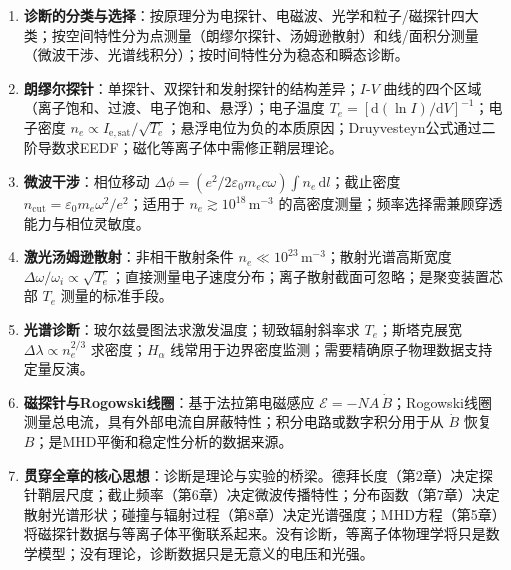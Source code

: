 \documentclass[12pt,a4paper,openany,oneside]{book}
\newcommand{\diff}{\mathrm{d}}
\newcommand{\eps}{\varepsilon}
\begin{document}
\begin{chapterreview}[title={第12章要点回顾：诊断——理论落地的桥梁}]
\begin{enumerate}
    \item \textbf{诊断的分类与选择}：按原理分为电探针、电磁波、光学和粒子/磁探针四大类；按空间特性分为点测量（朗缪尔探针、汤姆逊散射）和线/面积分测量（微波干涉、光谱线积分）；按时间特性分为稳态和瞬态诊断。
    
    \item \textbf{朗缪尔探针}：单探针、双探针和发射探针的结构差异；$I$-$V$ 曲线的四个区域（离子饱和、过渡、电子饱和、悬浮）；电子温度 $T_e = [\diff(\ln I)/\diff V]^{-1}$；电子密度 $n_e \propto I_{\mathrm{e,sat}}/\sqrt{T_e}$；悬浮电位为负的本质原因；Druyvesteyn公式通过二阶导数求EEDF；磁化等离子体中需修正鞘层理论。
    
    \item \textbf{微波干涉}：相位移动 $\Delta\phi = (e^2/2\eps_0 m_e c\omega) \int n_e\,\diff l$；截止密度 $n_{\mathrm{cut}} = \eps_0 m_e \omega^2/e^2$；适用于 $n_e \gtrsim 10^{18}\,\mathrm{m}^{-3}$ 的高密度测量；频率选择需兼顾穿透能力与相位灵敏度。
    
    \item \textbf{激光汤姆逊散射}：非相干散射条件 $n_e \ll 10^{23}\,\mathrm{m}^{-3}$；散射光谱高斯宽度 $\Delta\omega/\omega_i \propto \sqrt{T_e}$；直接测量电子速度分布；离子散射截面可忽略；是聚变装置芯部 $T_e$ 测量的标准手段。
    
    \item \textbf{光谱诊断}：玻尔兹曼图法求激发温度；韧致辐射斜率求 $T_e$；斯塔克展宽 $\Delta\lambda \propto n_e^{2/3}$ 求密度；$H_\alpha$ 线常用于边界密度监测；需要精确原子物理数据支持定量反演。
    
    \item \textbf{磁探针与Rogowski线圈}：基于法拉第电磁感应 $\mathcal{E} = -N A\,\dot{B}$；Rogowski线圈测量总电流，具有外部电流自屏蔽特性；积分电路或数字积分用于从 $\dot{B}$ 恢复 $B$；是MHD平衡和稳定性分析的数据来源。
    
    \item \textbf{贯穿全章的核心思想}：诊断是理论与实验的桥梁。德拜长度（第2章）决定探针鞘层尺度；截止频率（第6章）决定微波传播特性；分布函数（第7章）决定散射光谱形状；碰撞与辐射过程（第8章）决定光谱强度；MHD方程（第5章）将磁探针数据与等离子体平衡联系起来。没有诊断，等离子体物理学将只是数学模型；没有理论，诊断数据只是无意义的电压和光强。
\end{enumerate}
\end{chapterreview}
\end{document}
